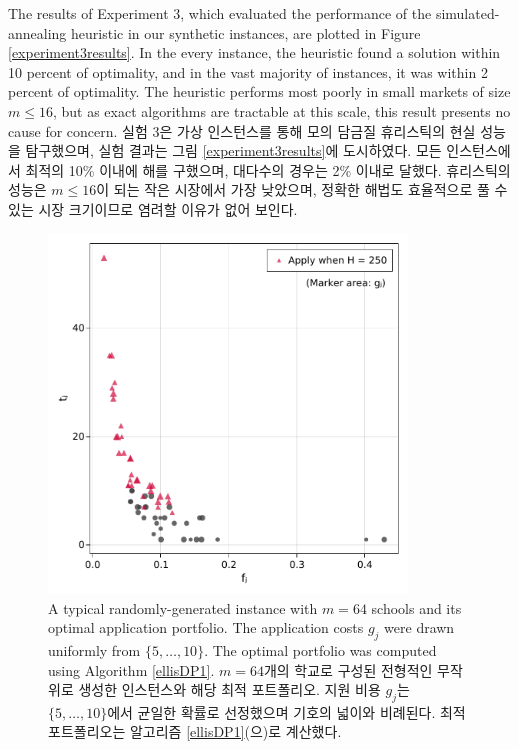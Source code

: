 \documentclass[11pt]{article} %
\theoremstyle{definition}
\theoremstyle{definition}
\begin{document}
\ifen
The results of Experiment 3, which evaluated the performance of the simulated-annealing heuristic in our synthetic instances, are plotted in Figure \ref{experiment3results}. In the every instance, the heuristic found a solution within 10 percent of optimality, and in the vast majority of instances, it was within 2 percent of optimality. The heuristic performs most poorly in small markets of size $m \leq 16$, but as exact algorithms are tractable at this scale, this result presents no cause for concern.
\else
실험 3은 가상 인스턴스를 통해 모의 담금질 휴리스틱의 현실 성능을 탐구했으며, 실험 결과는 그림 \ref{experiment3results}에 도시하였다. 모든 인스턴스에서 최적의 10\% 이내에 해를 구했으며, 대다수의 경우는 2\% 이내로 달했다. 휴리스틱의 성능은 $m \leq 16$이 되는 작은 시장에서 가장 낮았으며, 정확한 해법도 효율적으로 풀 수 있는 시장 크기이므로 염려할 이유가 없어 보인다.
\fi





\newcommand{\lastptofcaption}{\ifen
For each value of $m$, \nmarkets~markets were generated, and the computation time was recorded as fastest of three repetitions of the algorithm. The table shows the average time (standard deviation) over the \nmarkets~instances.
\else 각 $m$에 대해 \nmarkets 개의 시장을 생성했으며 알고리즘을 3번 반복하여 그중 최소 계산 시간을 기록했다. 표에서 \nmarkets 개의 인스턴스에 대한 평균 (표준편차) 시간이 나타난다.\fi}



\begin{figure}[h!] 
\centering
\includegraphics[width=0.85\textwidth]{./plots/samplemarket.pdf}
  \caption{\label{samplemarket}
 \ifen A typical randomly-generated instance with $m=64$ schools and its optimal application portfolio. The application costs $g_j$ were drawn uniformly from $\{5, \dots, 10\}$. The optimal portfolio was computed using Algorithm \ref{ellisDP1}.
 \else $m=64$개의 학교로 구성된 전형적인 무작위로 생성한 인스턴스와 해당 최적 포트폴리오. 지원 비용 $g_j$는 $\{5, \dots, 10\}$에서 균일한 확률로 선정했으며 기호의 넓이와 비례된다. 최적 포트폴리오는 알고리즘 \ref{ellisDP1}(으)로 계산했다. \fi}
\end{figure}
\end{document}
